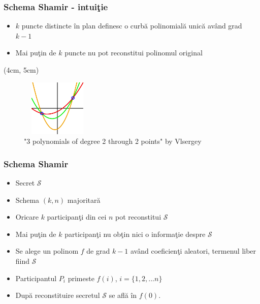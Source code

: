 \documentclass{beamer}
\theoremstyle{definition}
\begin{document}
\begin{frame}
    \frametitle{Schema Shamir - intui\c{t}ie}
    \begin{itemize}
        \item $k$ puncte distincte \^{i}n plan definesc o curb\u{a} polinomial\u{a} unic\u{a} av\^{a}nd grad $k - 1$
        \pause
        \item Mai pu\c{t}in de $k$ puncte nu pot reconstitui polinomul original
    \end{itemize}
    \pause
     {
        \begin{textblock*}{4cm}(4cm, 5cm)
        \begin{figure}
            \includegraphics[width=3.5cm,height=2.7cm,keepaspectratio]{img/shamir/shamir.png}
            \caption{"3 polynomials of degree 2 through 2 points" by Vlsergey}
        \end{figure}
        \end{textblock*}
     }
\end{frame}

\begin{frame}
    \frametitle{Schema Shamir}
    \begin{itemize}
        \item Secret $\mathcal{S}$
        \pause
        \item Schema $(k,n)$ majoritar\u{a}
        \pause
        \item Oricare $k$ participan\c{t}i din cei $n$ pot reconstitui $\mathcal{S}$
        \pause
        \item Mai pu\c{t}in de $k$ participan\c{t}i nu ob\c{t}in nici o informa\c{t}ie despre $\mathcal{S}$
        \pause
        \item Se alege un polinom $f$ de grad $k - 1$ av\^{a}nd coeficien\c{t}i aleatori, termenul liber fiind $\mathcal{S}$
        \pause
        \item Participantul $P_i$ primeste $f(i)$, $i = \{1, 2, ...n\}$
        \pause
        \item Dup\u{a} reconstituire secretul $\mathcal{S}$ se afl\u{a} \^{i}n $f(0)$.
    \end{itemize}
\end{frame}
\end{document}
